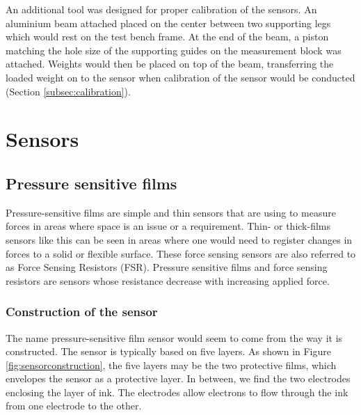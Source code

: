 An additional tool was designed for proper calibration of the sensors. An aluminium beam attached placed on the center between two supporting legs which would rest on the test bench frame. At the end of the beam, a piston matching the hole size of the supporting guides on the measurement block was attached. Weights would then be placed on top of the beam, transferring the loaded weight on to the sensor when calibration of the sensor would be conducted (Section \ref{subsec:calibration}). 

\section{Sensors}
\label{sec:sensors}
\subsection{Pressure sensitive films}
Pressure-sensitive films are simple and thin sensors that are using to measure forces in areas where space is an issue or a requirement. Thin- or thick-films sensors like this can be seen in areas where one would need to register changes in forces to a solid or flexible surface. These force sensing sensors are also referred to as Force Sensing Resistors (FSR). Pressure sensitive films and force sensing resistors are sensors whose resistance decrease with increasing applied force.

\subsubsection{Construction of the sensor}
The name pressure-sensitive film sensor would seem to come from the way it is constructed. The sensor is typically based on five layers. As shown in Figure \ref{fig:sensorconstruction}, the five layers may be the two protective films, which envelopes the sensor as a protective layer. In between, we find the two electrodes enclosing the layer of ink. The electrodes allow electrons to flow through the ink from one electrode to the other.

